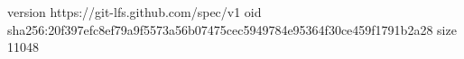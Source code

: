 version https://git-lfs.github.com/spec/v1
oid sha256:20f397efc8ef79a9f5573a56b07475cec5949784e95364f30ce459f1791b2a28
size 11048

